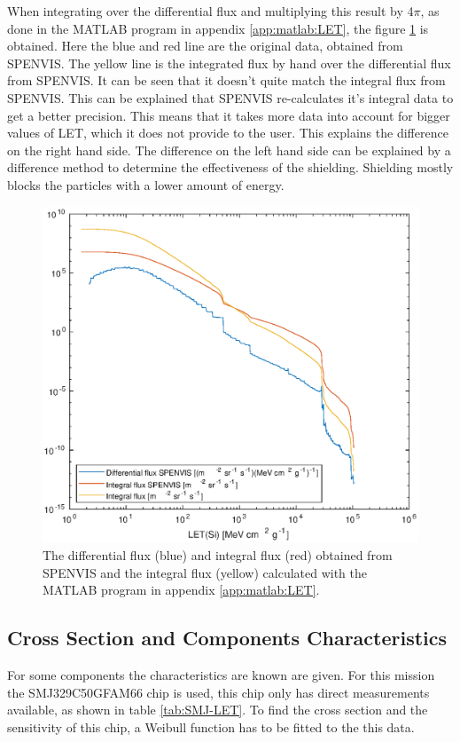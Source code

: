 When integrating over the differential flux and multiplying this result by 4$\pi$, as done in the MATLAB program in appendix \ref{app:matlab:LET}, the figure \ref{fig:matlab:LET-shielding} is obtained. Here the blue and red line are the original data, obtained from SPENVIS. The yellow line is the integrated flux by hand over the differential flux from SPENVIS. It can be seen that it doesn't quite match the integral flux from SPENVIS. This can be explained that SPENVIS re-calculates it's integral data to get a better precision. This means that it takes more data into account for bigger values of LET, which it does not provide to the user. This explains the difference on the right hand side. The difference on the left hand side can be explained by a difference method to determine the effectiveness of the shielding. Shielding mostly blocks the particles with a lower amount of energy.

\begin{figure}[H]
\centering
\includegraphics[width=.7\textwidth]{data/LET/LET.eps}
\caption{The differential flux (blue) and integral flux (red) obtained from SPENVIS and the integral flux (yellow) calculated with the MATLAB program in appendix \ref{app:matlab:LET}.}
\label{fig:matlab:LET-shielding}
\end{figure}


\subsection{\label{subsec:CSCC}Cross Section and Components Characteristics}
For some components the  characteristics are known are given. For this mission the SMJ329C50GFAM66 chip is used, this chip only has direct measurements available, as shown in table \ref{tab:SMJ-LET}. To find the cross section and the sensitivity of this chip, a Weibull function has to be fitted to the this data.

